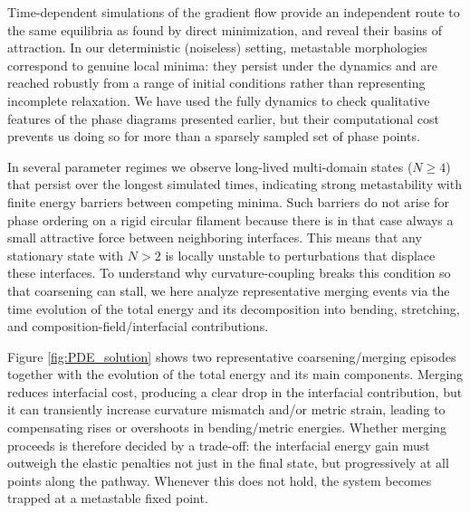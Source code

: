 \documentclass[
aip,
jcp,
reprint, 
floatfix
]{revtex4-1}
\begin{document}
Time-dependent simulations of the gradient flow provide an independent route to the same equilibria as found by direct minimization, and reveal their basins of attraction. In our deterministic (noiseless) setting, metastable morphologies correspond to genuine local minima: they persist under the dynamics and are reached robustly from a range of initial conditions rather than representing incomplete relaxation. We have used the fully dynamics to check qualitative features of the phase diagrams presented earlier, but their computational cost prevents us doing so for more than a sparsely sampled set of phase points. 

In several parameter regimes we observe long-lived multi-domain states ($N\ge 4$) that persist over the longest simulated times, indicating strong metastability with finite energy barriers between competing minima. Such barriers do not arise for phase ordering on a rigid circular filament because there is in that case always a small attractive force between neighboring interfaces. This means that any stationary state with $N>2$ is locally unstable to perturbations that displace these interfaces. To understand why curvature-coupling breaks this condition so that coarsening can stall, we here analyze representative merging events via the time evolution of the total energy and its decomposition into bending, stretching, and composition-field/interfacial contributions. 

Figure \ref{fig:PDE_solution} shows two representative coarsening/merging episodes together with the evolution of the total energy and its main components. Merging reduces interfacial cost, producing a clear drop in the interfacial contribution, but it can transiently increase curvature mismatch and/or metric strain, leading to compensating rises or overshoots in bending/metric energies. Whether merging proceeds is therefore decided by a trade-off: the interfacial energy gain must outweigh the elastic penalties not just in the final state, but progressively at all points along the pathway. Whenever this does not hold, the system becomes trapped at a metastable fixed point.
\end{document}
